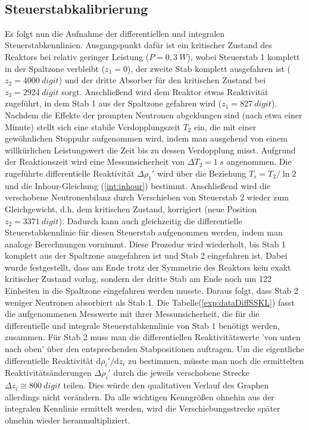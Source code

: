     \ \\    


    \subsection{Steuerstabkalibrierung}
    Es folgt nun die Aufnahme der differentiellen und integralen Steuerstabkennlinien. Ausgangspunkt dafür ist ein kritischer Zustand des Reaktors bei relativ geringer Leistung ($P = 0,3\ \unit{W}$), wobei Steuerstab 1 komplett in der Spaltzone verbleibt ($z_1 = 0$), der zweite Stab komplett ausgefahren ist ($z_2 = 4000\ \unit{digit}$) und der dritte Absorber für den kritischen Zustand bei $z_3 = 2924\ \unit{digit}$ sorgt. Anschließend wird dem Reaktor etwas Reaktivität zugeführt, in dem Stab 1 aus der Spaltzone gefahren wird ($z_1 = 827\ \unit{digit}$). Nachdem die Effekte der prompten Neutronen abgeklungen sind (nach etwa einer Minute) stellt sich eine stabile Verdopplungszeit $T_2$ ein, die mit einer gewöhnlichen Stoppuhr aufgenommen wird, indem man ausgehend von einem willkürlichen Leistungswert die Zeit bis zu dessen Verdopplung misst. Aufgrund der Reaktionszeit wird eine Messunsicherheit von $\Delta T_2 = 1\ \unit{s}$ angenommen. Die zugeführte differentielle Reaktivität $\Delta\rho_1\prime$ wird über die Beziehung $T_s = T_2 / \ln2$ und die Inhour-Gleichung (\ref{int:inhour}) bestimmt. Anschließend wird die verschobene Neutronenbilanz durch Verschieben von Steuerstab 2 wieder zum Gleichgewicht, d.h. dem kritischen Zustand, korrigiert (neue Position $z_2 = 3371\ \unit{digit}$). Dadurch kann auch gleichzeitig die differentielle Steuerstabkennlinie für diesen Steuerstab aufgenommen werden, indem man analoge Berechnungen vornimmt. Diese Prozedur wird wiederholt, bis Stab 1 komplett aus der Spaltzone ausgefahren ist und Stab 2 eingefahren ist. Dabei wurde festgestellt, dass am Ende trotz der Symmetrie des Reaktors kein exakt kritischer Zustand vorlag, sondern der dritte Stab am Ende noch um 122 Einheiten in die Spaltzone eingefahren werden musste. Daraus folgt, dass Stab 2 weniger Neutronen absorbiert als Stab 1. Die Tabelle(\ref{exp:dataDiffSSKL}) fasst die aufgenommenen Messwerte mit ihrer Messunsicherheit, die für die differentielle und integrale Steuerstabkennlinie von Stab 1 benötigt werden, zusammen. Für Stab 2 muss man die differentiellen Reaktivitätswerte 'von unten nach oben' über den entsprechenden Stabpositionen auftragen. Um die eigentliche differentielle Reaktivität $\mathrm{d}\rho_i\prime/\mathrm{d}z_i$ zu bestimmen, müsste man noch die ermittelten Reaktivitätsänderungen $\Delta\rho_i\prime$ durch die jeweils verschobene Strecke $\Delta z_i \cong 800\ \unit{digit}$ teilen. Dies würde den qualitativen Verlauf des Graphen allerdings nicht verändern. Da alle wichtigen Kenngrößen ohnehin aus der integralen Kennlinie ermittelt werden, wird die Verschiebungsstrecke später ohnehin wieder heranmultipliziert.\\
